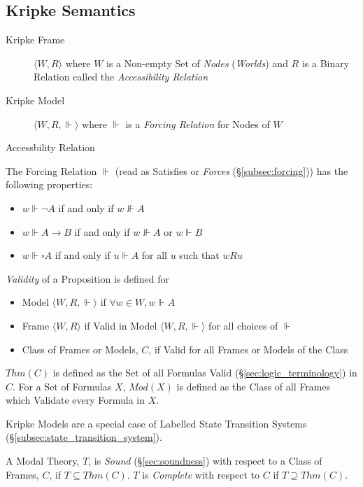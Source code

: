\subsection{Kripke Semantics}\label{subsec:kripke_semantics}

\begin{description}
\item [Kripke Frame] $\langle W,R \rangle$ where $W$ is a Non-empty
  Set of \emph{Nodes} (\emph{Worlds}) and $R$ is a Binary Relation
  called the \emph{Accessibility Relation}
\item [Kripke Model] $\langle W,R,\Vdash \rangle$ where $\Vdash$ is a
  \emph{Forcing Relation} for Nodes of $W$
\end{description}
Accessbility Relation %

The Forcing Relation $\Vdash$ (read as Satisfies or \emph{Forces}
(\S\ref{subsec:forcing})) has the following properties:
\begin{itemize}
\item $w \Vdash \neg A$ if and only if $w \nVdash A$
\item $w \Vdash A \rightarrow B$ if and only if $w \nVdash A$ or $w
  \Vdash B$
\item $w \Vdash \square A$ if and only if $u \Vdash A$ for all $u$
  such that $w R u$
\end{itemize}
\emph{Validity} of a Proposition is defined for
\begin{itemize}
\item Model $\langle W,R, \Vdash \rangle$ if $\forall w \in W,
  w \Vdash A$
\item Frame $\langle W,R \rangle$ if Valid in Model $\langle W,R,
  \Vdash \rangle$ for all choices of $\Vdash$
\item Class of Frames or Models, $C$, if Valid for all Frames or
  Models of the Class
\end{itemize}
$Thm(C)$ is defined as the Set of all Formulas Valid
(\S\ref{sec:logic_terminology}) in $C$. For a Set of Formulas $X$,
$Mod(X)$ is defined as the Class of all Frames which Validate every
Formula in $X$.

Kripke Models are a special case of Labelled State Transition Systems
(\S\ref{subsec:state_transition_system}).

A Modal Theory, $T$, is \emph{Sound} (\S\ref{sec:soundness}) with
respect to a Class of Frames, $C$, if $T \subseteq Thm(C)$. $T$ is
\emph{Complete} with respect to $C$ if $T \supseteq Thm(C)$.

